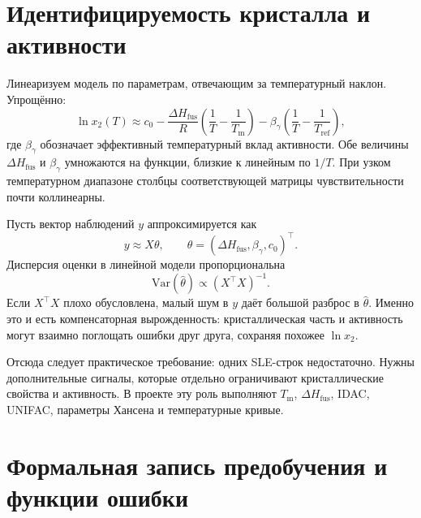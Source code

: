 \documentclass[11pt]{article}
\newcommand{\Var}{\mathrm{Var}}
\newcommand{\Tm}{T_{\mathrm m}}
\newcommand{\dHfus}{\Delta H_{\mathrm{fus}}}
\theoremstyle{definition}
\begin{document}
\section{Идентифицируемость кристалла и активности}
\label{app:identifiability}

Линеаризуем модель по параметрам, отвечающим за температурный наклон. Упрощённо:
\begin{equation*}
    \ln x_2(T)
    \approx c_0
    -\frac{\dHfus}{R}\left(\frac{1}{T}-\frac{1}{\Tm}\right)
    -\beta_{\gamma}\left(\frac{1}{T}-\frac{1}{T_{\mathrm{ref}}}\right),
\end{equation*}
где $\beta_{\gamma}$ обозначает эффективный температурный вклад активности. Обе величины $\dHfus$ и $\beta_{\gamma}$ умножаются на функции, близкие к линейным по $1/T$. При узком температурном диапазоне столбцы соответствующей матрицы чувствительности почти коллинеарны.

Пусть вектор наблюдений $y$ аппроксимируется как
\begin{equation*}
    y\approx X\theta,\qquad
    \theta=(\dHfus,\beta_{\gamma},c_0)^\top.
\end{equation*}
Дисперсия оценки в линейной модели пропорциональна
\begin{equation*}
    \Var(\widehat\theta)\propto (X^\top X)^{-1}.
\end{equation*}
Если $X^\top X$ плохо обусловлена, малый шум в $y$ даёт большой разброс в $\widehat\theta$. Именно это и есть компенсаторная вырожденность: кристаллическая часть и активность могут взаимно поглощать ошибки друг друга, сохраняя похожее $\ln x_2$.

Отсюда следует практическое требование: одних SLE-строк недостаточно. Нужны дополнительные сигналы, которые отдельно ограничивают кристаллические свойства и активность. В проекте эту роль выполняют $\Tm$, $\dHfus$, IDAC, UNIFAC, параметры Хансена и температурные кривые.

\section{Формальная запись предобучения и функции ошибки}
\label{app:loss-pretraining}
\end{document}
